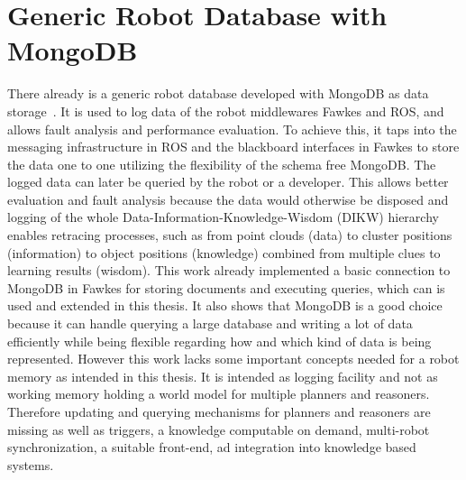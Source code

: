 \section{Generic Robot Database with MongoDB}
\label{sec:mongo-logging}
There already is a generic robot database developed with MongoDB as
data storage~\cite{RoboDB}. It is used to log data of the robot
middlewares Fawkes and ROS, and allows fault analysis and performance
evaluation. To achieve this, it taps into the messaging infrastructure
in ROS and the blackboard interfaces in Fawkes to store the data one
to one utilizing the flexibility of the schema free MongoDB. The
logged data can later be queried by the robot or a developer. This
allows better evaluation and fault analysis because the data would
otherwise be disposed and logging of the whole
Data-Information-Knowledge-Wisdom (DIKW) hierarchy~\cite{DIKW} enables
retracing processes, such as from point clouds (data) to cluster
positions (information) to object positions (knowledge) combined from
multiple clues to learning results (wisdom). This work already
implemented a basic connection to MongoDB in Fawkes for storing
documents and executing queries, which can is used and extended in
this thesis. It also shows that MongoDB is a good choice because it
can handle querying a large database and writing a lot of data
efficiently while being flexible regarding how and which kind of data
is being represented.  However this work lacks some important concepts
needed for a robot memory as intended in this thesis. It is intended
as logging facility and not as working memory holding a world model
for multiple planners and reasoners. Therefore updating and querying
mechanisms for planners and reasoners are missing as well as triggers,
a knowledge computable on demand, multi-robot synchronization, a
suitable front-end, ad integration into knowledge based systems.

